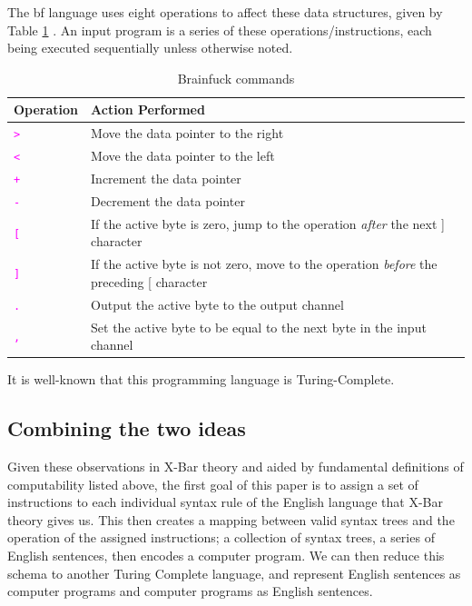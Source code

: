\documentclass[runningheads]{llncs}
\newcommand{\code}[1]{\texttt{\textcolor{magenta}{\setlength{\fboxsep}{1pt}\colorbox{lightgray!20}{#1}}}}
\begin{document}
The bf language uses eight operations to affect these data structures, given by Table \ref{table:bf} . An input program is a series of these operations/instructions, each being executed sequentially unless otherwise noted.
\begin{table}[H]
\begin{tabular}{l|l}
\textbf{Operation} & \textbf{Action Performed}                                                                \\ \hline
\code{>}      & Move the data pointer to the right                                                       \\
\code{<}         & Move the data pointer to the left                                                        \\
\code{+}                  & Increment the data pointer                                                               \\
\code{-}                   & Decrement the data pointer                                                               \\
\code{[}                 & If the active byte is zero, jump to the operation \textit{after} the next {]} character           \\
\code{]}                & If the active byte is not zero, move to the operation \textit{before} the preceding {[} character \\
\code{.}               & Output the active byte to the output channel                                             \\
\code{,}                 & Set the active byte to be equal to the next byte in the input channel
\end{tabular}
\vspace{1em}
\caption{Brainfuck commands}
\label{table:bf}
\end{table}

It is well-known that this programming language is Turing-Complete.\cite{bf_turing_complete}

\subsection{Combining the two ideas}
Given these observations in X-Bar theory and aided by fundamental definitions of computability listed above, the first goal of this paper is to assign a set of instructions to each individual syntax rule of the English language that X-Bar theory gives us. This then creates a mapping between valid syntax trees and the operation of the assigned instructions; a collection of syntax trees, a series of English sentences, then encodes a computer program. We can then reduce this schema to another Turing Complete language, and represent English sentences as computer programs and computer programs as English sentences.
\end{document}
